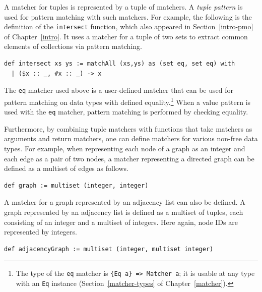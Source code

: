 A matcher for tuples is represented by a tuple of matchers.
A \emph{tuple pattern} is used for pattern matching with such matchers.
For example, the following is the definition of the \lstinline{intersect} function, which also appeared in Section~\ref{intro-pmo} of Chapter~\ref{intro}.
It uses a matcher for a tuple of two sets to extract common elements of collections via pattern matching.
\begin{lstlisting}[language=egison,numbers=none]
def intersect xs ys := matchAll (xs,ys) as (set eq, set eq) with
  | ($x :: _, #x :: _) -> x
\end{lstlisting}
The \lstinline{eq} matcher used above is a user-defined matcher that can be used for pattern matching on data types with defined equality.\footnote{The type of the \lstinline{eq} matcher is \lstinline|{Eq a} => Matcher a|; it is usable at any type with an \lstinline{Eq} instance (Section~\ref{matcher-types} of Chapter~\ref{matcher}).}
When a value pattern is used with the \lstinline{eq} matcher, pattern matching is performed by checking equality.

Furthermore, by combining tuple matchers with functions that take matchers as arguments and return matchers, one can define matchers for various non-free data types.
For example, when representing each node of a graph as an integer and each edge as a pair of two nodes,
a matcher representing a directed graph can be defined as a multiset of edges as follows.
\begin{lstlisting}[language=egison,numbers=none]
def graph := multiset (integer, integer)
\end{lstlisting}
A matcher for a graph represented by an adjacency list can also be defined.
A graph represented by an adjacency list is defined as a multiset of tuples, each consisting of an integer and a multiset of integers.
Here again, node IDs are represented by integers.
\begin{lstlisting}[language=egison,numbers=none]
def adjacencyGraph := multiset (integer, multiset integer)
\end{lstlisting}

